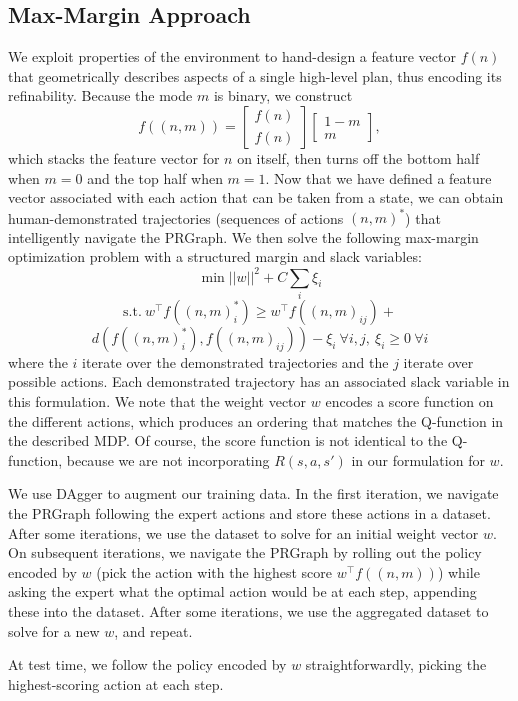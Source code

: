 \subsection{Max-Margin Approach}
We exploit properties of the environment to hand-design a feature vector $f(n)$ that geometrically
describes aspects of a single high-level plan, thus encoding its refinability. Because the mode $m$ is binary,
we construct $$f((n, m)) = \begin{bmatrix} f(n) \\ f(n) \end{bmatrix} \begin{bmatrix} 1 - m \\ m \end{bmatrix},$$
which stacks the feature vector for $n$ on itself, then turns off the bottom half when $m = 0$ and the
top half when $m = 1$. Now that we have defined a feature vector associated with each action that can be taken
from a state, we can obtain human-demonstrated trajectories (sequences of actions $(n, m)^{*}$) that intelligently
navigate the PRGraph. We then solve the following max-margin optimization problem with a structured margin and slack variables:
$$\min ||w||^{2} + C\sum_{i} \xi_{i}$$
$$\text{s.t.}\ w^{\top}f((n, m)_{i}^{*}) \geq w^{\top}f((n, m)_{ij}) + $$
$$d(f((n, m)_{i}^{*}), f((n, m)_{ij})) - \xi_{i}\ \forall i, j,\ \xi_{i} \geq 0\ \forall i$$
where the $i$ iterate over the demonstrated trajectories and the $j$ iterate over possible actions. Each
demonstrated trajectory has an associated slack variable in this formulation.
We note that the weight vector $w$ encodes a score function on the different actions, which produces
an ordering that matches the Q-function in the described MDP. Of course, the score function is not identical
to the Q-function, because we are not incorporating $R(s, a, s')$ in our formulation for $w$.

We use DAgger to augment our training data. In the first iteration, we navigate the PRGraph following
the expert actions and store these actions in a dataset. After some iterations, we use the dataset to solve for an
initial weight vector $w$. On subsequent iterations, we navigate the PRGraph by rolling out the policy
encoded by $w$ (pick the action with the highest score $w^{\top}f((n, m))$) while asking the expert what
the optimal action would be at each step, appending these into the dataset. After some iterations, we use the
aggregated dataset to solve for a new $w$, and repeat.

At test time, we follow the policy encoded by $w$ straightforwardly, picking the highest-scoring action
at each step.